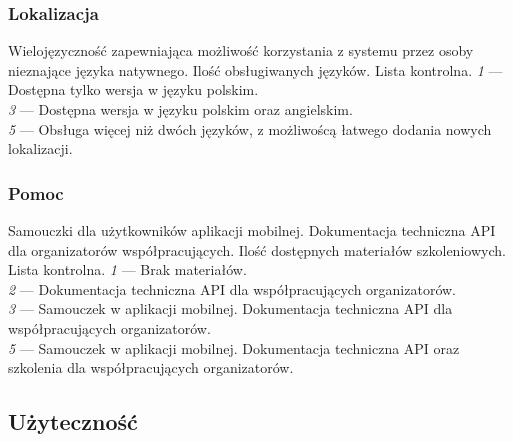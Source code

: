 \documentclass[10pt]{dokument-ppi}
\begin{document}
\subsubsection{Lokalizacja}
\begin{requirement}
    \desc%
        Wielojęzyczność zapewniająca możliwość korzystania z systemu przez osoby
        nieznające języka natywnego.
    \metric%
        Ilość obsługiwanych języków.
    \tool%
        Lista kontrolna.
    \scale%
        \emph{1} --- Dostępna tylko wersja w języku polskim.\\
        \emph{3} --- Dostępna wersja w języku polskim oraz angielskim.\\
        \emph{5} --- Obsługa więcej niż dwóch języków, z możliwoścą łatwego
            dodania nowych lokalizacji.
\end{requirement}

\subsubsection{Pomoc}
\begin{requirement}
    \desc%
        Samouczki dla użytkowników aplikacji mobilnej. Dokumentacja techniczna
        API dla organizatorów współpracujących.
    \metric%
        Ilość dostępnych materiałów szkoleniowych.
    \tool%
        Lista kontrolna.
    \scale%
        \emph{1} --- Brak materiałów.\\
        \emph{2} --- Dokumentacja techniczna API dla współpracujących
            organizatorów.\\
        \emph{3} --- Samouczek w aplikacji mobilnej. Dokumentacja techniczna API
            dla współpracujących organizatorów.\\
        \emph{5} --- Samouczek w aplikacji mobilnej. Dokumentacja techniczna API
            oraz szkolenia dla współpracujących organizatorów.
\end{requirement}


\subsection{Użyteczność}
\end{document}
